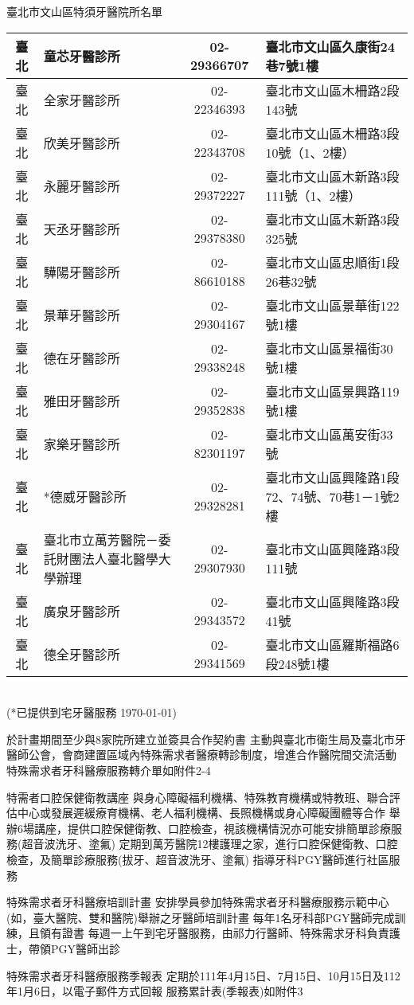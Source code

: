 臺北市文山區特須牙醫院所名單\\ %
\begin{tabularx}{1.093\textwidth}{|c|p{3.2cm}|c|l|}
\hline
臺北&	童芯牙醫診所&	02-29366707 &	臺北市文山區久康街24巷7號1樓\\
\hline
臺北&	全家牙醫診所&	02-22346393 &	臺北市文山區木柵路2段143號\\
\hline
臺北 &	欣美牙醫診所 &	02-22343708 &	臺北市文山區木柵路3段10號（1、2樓）\\
\hline
臺北 &	永麗牙醫診所 &	02-29372227 &	臺北市文山區木新路3段111號（1、2樓）\\
\hline
臺北 &	天丞牙醫診所 &	02-29378380 &	臺北市文山區木新路3段325號\\
\hline
臺北 &	驊陽牙醫診所 &	02-86610188 &	臺北市文山區忠順街1段26巷32號\\
\hline
臺北 &	景華牙醫診所 &	02-29304167 &	臺北市文山區景華街122號1樓\\
\hline
臺北 &	德在牙醫診所 &	02-29338248 &	臺北市文山區景福街30號1樓\\
\hline
臺北 &	雅田牙醫診所 &	02-29352838 &	臺北市文山區景興路119號1樓\\
\hline
臺北 &	家樂牙醫診所 &	02-82301197 &	臺北市文山區萬安街33號\\
\hline
臺北 &	*德威牙醫診所 &	02-29328281 &	臺北市文山區興隆路1段72、74號、70巷1－1號2樓\\
\hline
臺北 &	臺北市立萬芳醫院－委託財團法人臺北醫學大學辦理
&	02-29307930 &	臺北市文山區興隆路3段111號\\
\hline
臺北 &	廣泉牙醫診所 &	02-29343572 &	臺北市文山區興隆路3段41號\\
\hline
臺北 &	德全牙醫診所 &	02-29341569 &	臺北市文山區羅斯福路6段248號1樓\\
\hline
\end{tabularx}\\
(*已提供到宅牙醫服務 \today)
   
\begin{outline}   
    \2 於計畫期間至少與8家院所建立並簽具合作契約書
    \2 主動與臺北市衛生局及臺北市牙醫師公會，會商建置區域內特殊需求者醫療轉診制度，增進合作醫院間交流活動
    \2 特殊需求者牙科醫療服務轉介單如附件2-4

\1 特需者口腔保健衛教講座
    \2 與身心障礙福利機構、特殊教育機構或特教班、聯合評估中心或發展遲緩療育機構、老人福利機構、長照機構或身心障礙團體等合作
    \2 舉辦6場講座，提供口腔保健衛教、口腔檢查，視該機構情況亦可能安排簡單診療服務(超音波洗牙、塗氟)
    \2 定期到萬芳醫院12樓護理之家，進行口腔保健衛教、口腔檢查，及簡單診療服務(拔牙、超音波洗牙、塗氟)
    \2 指導牙科PGY醫師進行社區服務
    
\1 特殊需求者牙科醫療培訓計畫
    \2 安排學員參加特殊需求者牙科醫療服務示範中心(如，臺大醫院、雙和醫院)舉辦之牙醫師培訓計畫
    \2 每年1名牙科部PGY醫師完成訓練，且領有證書
    \2 每週一上午到宅牙醫服務，由祁力行醫師、特殊需求牙科負責護士，帶領PGY醫師出診
    
\1 特殊需求者牙科醫療服務季報表
    \2 定期於111年4月15日、7月15日、10月15日及112年1月6日，以電子郵件方式回報
    \2 服務累計表(季報表)如附件3


\end{outline}

